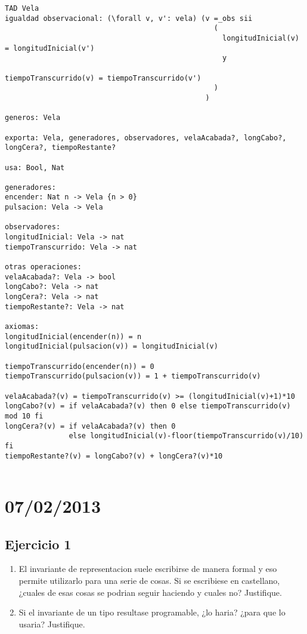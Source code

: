 \documentclass[10pt, a4paper]{article}
\begin{document}
\newpage
\begin{verbatim}
TAD Vela
igualdad observacional: (\forall v, v': vela) (v =_obs sii 
                                                 ( 
                                                   longitudInicial(v) = longitudInicial(v') 
                                                   y 
                                                   tiempoTranscurrido(v) = tiempoTranscurrido(v')
                                                 )
                                               )

generos: Vela

exporta: Vela, generadores, observadores, velaAcabada?, longCabo?, longCera?, tiempoRestante?

usa: Bool, Nat

generadores:
encender: Nat n -> Vela {n > 0}
pulsacion: Vela -> Vela

observadores:
longitudInicial: Vela -> nat
tiempoTranscurrido: Vela -> nat

otras operaciones:
velaAcabada?: Vela -> bool
longCabo?: Vela -> nat
longCera?: Vela -> nat
tiempoRestante?: Vela -> nat

axiomas:
longitudInicial(encender(n)) = n
longitudInicial(pulsacion(v)) = longitudInicial(v)

tiempoTranscurrido(encender(n)) = 0
tiempoTranscurrido(pulsacion(v)) = 1 + tiempoTranscurrido(v)

velaAcabada?(v) = tiempoTranscurrido(v) >= (longitudInicial(v)+1)*10
longCabo?(v) = if velaAcabada?(v) then 0 else tiempoTranscurrido(v) mod 10 fi
longCera?(v) = if velaAcabada?(v) then 0 
               else longitudInicial(v)-floor(tiempoTranscurrido(v)/10) fi
tiempoRestante?(v) = longCabo?(v) + longCera?(v)*10


\end{verbatim}

\newpage
\section{07/02/2013}

\subsection*{Ejercicio 1}

\begin{enumerate}
 \item El invariante de representacion suele escribirse de manera formal y eso permite utilizarlo para una serie de cosas. Si se escribiese en castellano, ¿cuales de esas cosas se podrian seguir haciendo y cuales no? Justifique.
 \item Si el invariante de un tipo resultase programable, ¿lo haria? ¿para que lo usaria? Justifique.
\end{enumerate}
\end{document}
